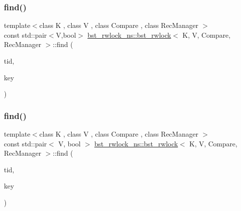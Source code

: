 \subsubsection{\texorpdfstring{find()}{find()}\hspace{0.1cm}{\footnotesize\ttfamily [1/2]}}
{\footnotesize\ttfamily template$<$class K , class V , class Compare , class Rec\+Manager $>$ \\
const std\+::pair$<$V,bool$>$ \hyperlink{classbst__rwlock__ns_1_1bst__rwlock}{bst\+\_\+rwlock\+\_\+ns\+::bst\+\_\+rwlock}$<$ K, V, Compare, Rec\+Manager $>$\+::find (\begin{DoxyParamCaption}\item[{const int}]{tid,  }\item[{const K \&}]{key }\end{DoxyParamCaption})}

\mbox{\label{classbst__rwlock__ns_1_1bst__rwlock_a90792997449ce93f586d3fef497e021c}} 
\subsubsection{\texorpdfstring{find()}{find()}\hspace{0.1cm}{\footnotesize\ttfamily [2/2]}}
{\footnotesize\ttfamily template$<$class K , class V , class Compare , class Rec\+Manager $>$ \\
const std\+::pair$<$ V, bool $>$ \hyperlink{classbst__rwlock__ns_1_1bst__rwlock}{bst\+\_\+rwlock\+\_\+ns\+::bst\+\_\+rwlock}$<$ K, V, Compare, Rec\+Manager $>$\+::find (\begin{DoxyParamCaption}\item[{const int}]{tid,  }\item[{const K \&}]{key }\end{DoxyParamCaption})}

\mbox{\label{classbst__rwlock__ns_1_1bst__rwlock_a786c88e4bafec7d09dc5f37a43d01aa1}} 
